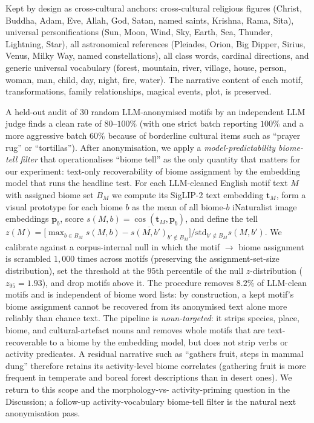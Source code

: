\documentclass[11pt,a4paper]{article}
\begin{document}
Kept by design as cross-cultural anchors: cross-cultural religious
figures (Christ, Buddha, Adam, Eve, Allah, God, Satan, named
saints, Krishna, Rama, Sita), universal personifications (Sun,
Moon, Wind, Sky, Earth, Sea, Thunder, Lightning, Star), all
astronomical references (Pleiades, Orion, Big Dipper, Sirius,
Venus, Milky Way, named constellations), all class words, cardinal
directions, and generic universal vocabulary (forest, mountain,
river, village, house, person, woman, man, child, day, night,
fire, water). The narrative content of each motif, transformations,
family relationships, magical events, plot, is preserved.

A held-out audit of $30$ random LLM-anonymised motifs by an
independent LLM judge finds a clean rate of $80$--$100\%$ (with one
strict batch reporting $100\%$ and a more aggressive batch $60\%$
because of borderline cultural items such as ``prayer rug'' or
``tortillas''). After anonymisation, we apply a
\emph{model-predictability biome-tell filter} that operationalises
``biome tell'' as the only quantity that matters for our
experiment: text-only recoverability of biome assignment by the
embedding model that runs the headline test. For each
LLM-cleaned English motif text $M$ with assigned biome set $B_M$ we
compute its SigLIP-2 text embedding $\mathbf{t}_M$, form a visual
prototype for each biome $b$ as the mean of all biome-$b$
iNaturalist image embeddings $\mathbf{p}_b$, score
$s(M,b)=\cos(\mathbf{t}_M,\mathbf{p}_b)$, and define the tell
$z(M) = \bigl[\max_{b\in B_M} s(M,b) - \overline{s(M,b')}_{b'\notin B_M}\bigr]
        / \mathrm{std}_{b'\notin B_M} s(M,b')$.
We calibrate against a corpus-internal null in which the motif
$\to$ biome assignment is scrambled $1{,}000$ times across motifs
(preserving the assignment-set-size distribution), set the threshold
at the $95$th percentile of the null $z$-distribution
($z_{95}=1.93$), and drop motifs above it. The procedure removes
$8.2\%$ of LLM-clean motifs and is independent of biome word
lists: by construction, a kept motif's biome assignment cannot be
recovered from its anonymised text alone more reliably than chance
text. The pipeline is \emph{noun-targeted}: it strips species,
place, biome, and cultural-artefact nouns and removes whole motifs
that are text-recoverable to a biome by the embedding model, but
does not strip verbs or activity predicates. A residual narrative
such as ``gathers fruit, steps in mammal dung'' therefore retains
its activity-level biome correlates (gathering fruit is more
frequent in temperate and boreal forest descriptions than in
desert ones). We return to this scope and the morphology-vs-
activity-priming question in the Discussion; a follow-up
activity-vocabulary biome-tell filter is the natural next
anonymisation pass.
\end{document}
